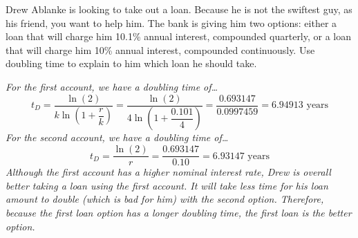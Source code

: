 \documentclass[12pt,letterpaper]{exam}
\begin{document}
\begin{questions}
\newpage
\question[10] Drew Ablanke is looking to take out a loan. Because he is not the swiftest guy, as his friend, you want to help him. The bank is giving him two options: either a loan that will charge him 10.1\% annual interest, compounded quarterly, or a loan that will charge him 10\% annual interest, compounded continuously. Use doubling time to explain to him which loan he should take. \pvspace{1cm}

{\itshape For the first account, we have a doubling time of\dots \pspace
	\[
	t_D= \dfrac{\ln(2)}{k \ln\left(1 + \dfrac{r}{k} \right)}= \dfrac{\ln(2)}{4 \ln\left(1 + \dfrac{0.101}{4} \right)}= \dfrac{0.693147}{0.0997459}= 6.94913 \text{ years}
	\] \pspace
For the second account, we have a doubling time of\dots \pspace
	\[
	t_D=  \dfrac{\ln(2)}{r}= \dfrac{0.693147}{0.10}= 6.93147 \text{ years}
	\] \pspace
Although the first account has a higher nominal interest rate, Drew is overall better taking a loan using the first account. It will take less time for his loan amount to double (which is bad for him) with the second option. Therefore, because the first loan option has a longer doubling time, the first loan is the better option.}


\end{questions}
\end{document}
